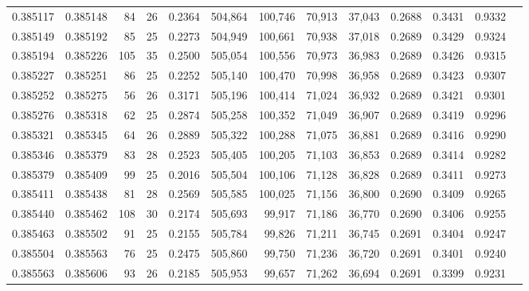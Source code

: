 \begin{tabular}{rrrrrrrrrrrrr}
0.385117 & 0.385148 &    84 &  26 &                                     0.2364 & 504,864 & 100,746 &  70,913 &  37,043 & 0.2688 & 0.3431 & 0.9332 \\
0.385149 & 0.385192 &    85 &  25 &                                     0.2273 & 504,949 & 100,661 &  70,938 &  37,018 & 0.2689 & 0.3429 & 0.9324 \\
0.385194 & 0.385226 &   105 &  35 &                                     0.2500 & 505,054 & 100,556 &  70,973 &  36,983 & 0.2689 & 0.3426 & 0.9315 \\
0.385227 & 0.385251 &    86 &  25 &                                     0.2252 & 505,140 & 100,470 &  70,998 &  36,958 & 0.2689 & 0.3423 & 0.9307 \\
0.385252 & 0.385275 &    56 &  26 &                                     0.3171 & 505,196 & 100,414 &  71,024 &  36,932 & 0.2689 & 0.3421 & 0.9301 \\
0.385276 & 0.385318 &    62 &  25 &                                     0.2874 & 505,258 & 100,352 &  71,049 &  36,907 & 0.2689 & 0.3419 & 0.9296 \\
0.385321 & 0.385345 &    64 &  26 &                                     0.2889 & 505,322 & 100,288 &  71,075 &  36,881 & 0.2689 & 0.3416 & 0.9290 \\
0.385346 & 0.385379 &    83 &  28 &                                     0.2523 & 505,405 & 100,205 &  71,103 &  36,853 & 0.2689 & 0.3414 & 0.9282 \\
0.385379 & 0.385409 &    99 &  25 &                                     0.2016 & 505,504 & 100,106 &  71,128 &  36,828 & 0.2689 & 0.3411 & 0.9273 \\
0.385411 & 0.385438 &    81 &  28 &                                     0.2569 & 505,585 & 100,025 &  71,156 &  36,800 & 0.2690 & 0.3409 & 0.9265 \\
0.385440 & 0.385462 &   108 &  30 &                                     0.2174 & 505,693 &  99,917 &  71,186 &  36,770 & 0.2690 & 0.3406 & 0.9255 \\
0.385463 & 0.385502 &    91 &  25 &                                     0.2155 & 505,784 &  99,826 &  71,211 &  36,745 & 0.2691 & 0.3404 & 0.9247 \\
0.385504 & 0.385563 &    76 &  25 &                                     0.2475 & 505,860 &  99,750 &  71,236 &  36,720 & 0.2691 & 0.3401 & 0.9240 \\
0.385563 & 0.385606 &    93 &  26 &                                     0.2185 & 505,953 &  99,657 &  71,262 &  36,694 & 0.2691 & 0.3399 & 0.9231 \\

\end{tabular}
